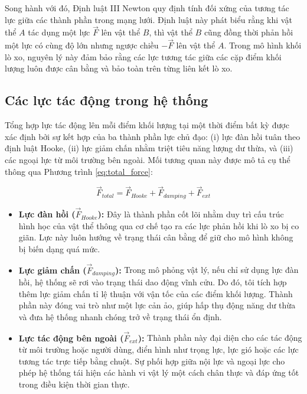 \documentclass{report}
\begin{document}
Song hành với đó, Định luật III Newton quy định tính đối xứng của tương tác lực giữa các thành phần trong mạng lưới. Định luật này phát biểu rằng khi vật thể $A$ tác dụng một lực $\vec{F}$ lên vật thể $B$, thì vật thể $B$ cũng đồng thời phản hồi một lực có cùng độ lớn nhưng ngược chiều $-\vec{F}$ lên vật thể $A$. Trong mô hình khối lò xo, nguyên lý này đảm bảo rằng các lực tương tác giữa các cặp điểm khối lượng luôn được cân bằng và bảo toàn trên từng liên kết lò xo.


\subsection{Các lực tác động trong hệ thống}

Tổng hợp lực tác động lên mỗi điểm khối lượng tại một thời điểm bất kỳ được xác định bởi sự kết hợp của ba thành phần lực chủ đạo: (i) lực đàn hồi tuân theo định luật Hooke, (ii) lực giảm chấn nhằm triệt tiêu năng lượng dư thừa, và (iii) các ngoại lực từ môi trường bên ngoài. Mối tương quan này được mô tả cụ thể thông qua Phương trình \ref{eq:total_force}:

\begin{equation}
    \vec{F}_{total} = \vec{F}_{Hooke} + \vec{F}_{damping} + \vec{F}_{ext}
    \label{eq:total_force}
\end{equation}

\begin{itemize}
    \item \textbf{Lực đàn hồi ($\vec{F}_{Hooke}$):} Đây là thành phần cốt lõi nhằm duy trì cấu trúc hình học của vật thể thông qua cơ chế tạo ra các lực phản hồi khi lò xo bị co giãn. Lực này luôn hướng về trạng thái cân bằng để giữ cho mô hình không bị biến dạng quá mức.
    
    \item \textbf{Lực giảm chấn ($\vec{F}_{damping}$):} Trong mô phỏng vật lý, nếu chỉ sử dụng lực đàn hồi, hệ thống sẽ rơi vào trạng thái dao động vĩnh cửu. Do đó, tôi tích hợp thêm lực giảm chấn tỉ lệ thuận với vận tốc của các điểm khối lượng. Thành phần này đóng vai trò như một lực cản ảo, giúp hấp thụ động năng dư thừa và đưa hệ thống nhanh chóng trở về trạng thái ổn định.
    
    \item \textbf{Lực tác động bên ngoài ($\vec{F}_{ext}$):} Thành phần này đại diện cho các tác động từ môi trường hoặc người dùng, điển hình như trọng lực, lực gió hoặc các lực tương tác trực tiếp bằng chuột. Sự phối hợp giữa nội lực và ngoại lực cho phép hệ thống tái hiện các hành vi vật lý một cách chân thực và đáp ứng tốt trong điều kiện thời gian thực.
\end{itemize}
\end{document}
